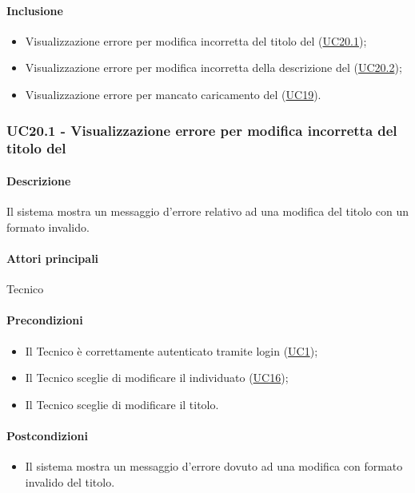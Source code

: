 \paragraph*{Inclusione}
\begin{itemize}
    \item Visualizzazione errore per modifica incorretta del titolo del  (\hyperref[UC20point1]{UC20.1});
    \item Visualizzazione errore per modifica incorretta della descrizione del  (\hyperref[UC20point2]{UC20.2});
    \item Visualizzazione errore per mancato caricamento del  (\hyperref[UC19]{UC19}).
\end{itemize}


\subsubsection{UC20.1 - Visualizzazione errore per modifica incorretta del titolo del }\label{UC20point1}
\paragraph*{Descrizione}
Il sistema mostra un messaggio d’errore relativo ad una modifica del titolo con un formato invalido.

\paragraph*{Attori principali}
Tecnico

\paragraph*{Precondizioni}
\begin{itemize}
  \item Il Tecnico è correttamente autenticato tramite login (\hyperref[UC1]{UC1});
  \item Il Tecnico sceglie di modificare il  individuato (\hyperref[UC16]{UC16});
  \item Il Tecnico sceglie di modificare il titolo.
\end{itemize}

\paragraph*{Postcondizioni}
\begin{itemize}
  \item Il sistema mostra un messaggio d’errore dovuto ad una modifica con formato invalido del titolo.
\end{itemize}

